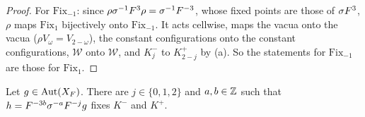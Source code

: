 \begin{proof}
For $\mathrm{Fix}_{-1}$: since $\rho\sigma^{-1}F^3\rho=\sigma^{-1}F^{-3}$, whose fixed points are those of $\sigma F^3$, $\rho$ maps $\mathrm{Fix}_1$ bijectively onto $\mathrm{Fix}_{-1}$. It acts cellwise, maps the vacua onto the vacua ($\rho V_\omega=V_{2-\omega}$), the constant configurations onto the constant configurations, $\mathcal W$ onto $\mathcal W$, and $K^-_j$ to $K^+_{2-j}$ by (a). So the statements for $\mathrm{Fix}_{-1}$ are those for $\mathrm{Fix}_1$.
\end{proof}

\begin{proposition}[normalisation]\label{c79:prop:offsets}
Let $g\in\operatorname{Aut}(X_F)$. There are $j\in\{0,1,2\}$ and $a,b\in\mathbb{Z}$ such that $h=F^{-3b}\sigma^{-a}F^{-j}g$ fixes $K^-$ and $K^+$.
\end{proposition}


